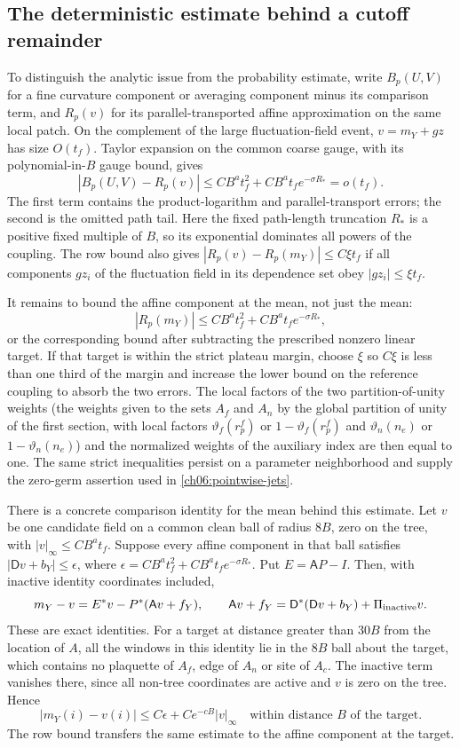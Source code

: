 \subsection{The deterministic estimate behind a cutoff remainder}

To distinguish the analytic issue from the probability estimate, write
$B_p(U,V)$ for a fine curvature component or averaging component minus its comparison term, and
$R_p(v)$ for its parallel-transported affine approximation on the same local
patch. On the complement of the large fluctuation-field event, $v=m_Y+gz$ has size $O(t_f)$.
Taylor expansion on the common coarse gauge, with its polynomial-in-$B$
gauge bound, gives
\[
 |B_p(U,V)-R_p(v)|
 \le C B^a t_f^2+C B^a t_f e^{-\sigma R_*}=o(t_f).
\]
The first term contains the product-logarithm and parallel-transport errors;
the second is the omitted path tail. Here the fixed path-length truncation
$R_*$ is a positive fixed multiple of $B$, so its exponential dominates
all powers of the coupling. The row bound also gives
$|R_p(v)-R_p(m_Y)|\le C\xi t_f$ if all components $gz_i$ of the fluctuation field in its
dependence set obey $|gz_i|\le\xi t_f$.

It remains to bound the affine component at the mean, not just the mean:
\begin{equation}
 |R_p(m_Y)|\le C B^a t_f^2+C B^a t_f e^{-\sigma R_*},
 \label{ch06:mean-target-needed}
\end{equation}
or the corresponding bound after subtracting the prescribed nonzero
linear target. If that target is within the strict plateau margin, choose
$\xi$ so $C\xi$ is less than one third of the margin and increase the
lower bound on the reference coupling to absorb the two errors. The local factors of the two partition-of-unity weights (the weights given to the sets $A_f$ and $A_n$ by the global partition of unity of the first section, with local factors $\vartheta_f(r_p^f)$ or $1-\vartheta_f(r_p^f)$ and $\vartheta_n(n_e)$ or $1-\vartheta_n(n_e)$)
and the normalized weights of the auxiliary index are then equal to one. The same strict
inequalities persist on a parameter neighborhood and supply the
zero-germ assertion used in \eqref{ch06:pointwise-jets}.

There is a concrete comparison identity for the mean behind this estimate. Let $v$
be one candidate field on a common clean ball of radius $8B$, zero on
the tree, with $|v|_\infty\le C B^a t_f$. Suppose every affine component in
that ball satisfies $|\mathsf Dv+b_Y|\le\epsilon$, where
$\epsilon= C B^a t_f^2+C B^a t_f e^{-\sigma R_*}$.
Put $E=\mathsf AP-I$. Then, with inactive identity coordinates included,
\[
 m_Y-v=E^*v-P^*(\mathsf Av+f_Y),\qquad
 \mathsf Av+f_Y=\mathsf D^*(\mathsf Dv+b_Y)+\Pi_{\rm inactive}v.
\]
These are exact identities. For a target at distance greater than $30B$ from the location of $A$,
all the windows in this identity lie in the $8B$ ball about the target,
which contains no plaquette of $A_f$, edge of $A_n$ or site of $A_c$. The inactive term vanishes
there, since all non-tree coordinates are active and $v$ is zero on
the tree. Hence
\[
 |m_Y(i)-v(i)|\le C\epsilon+C e^{-cB}|v|_\infty
 \quad\text{within distance }B\text{ of the target}.
\]
The row bound transfers the same estimate to the affine component at the target.

